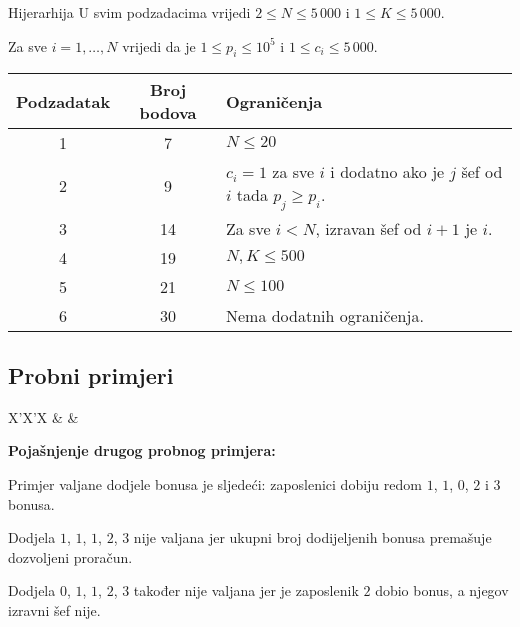 \begin{statement}[
  problempoints=100,
  timelimit=1 sekunda,
  memorylimit=1024 MiB,
]{Hijerarhija}
U svim podzadacima vrijedi $2 \leq N \leq 5\,000$ i $1 \leq K \leq 5\,000$.

Za sve $i = 1, \dots, N$ vrijedi da je $1 \leq p_i \leq 10^5$ i $1 \leq c_i \leq 5\,000$.

{\renewcommand{\arraystretch}{1.4}
  \setlength{\tabcolsep}{6pt}
  \begin{tabular}{ccl}
   Podzadatak & Broj bodova & Ograničenja \\ \midrule
   	1 & 7 & $N \leq 20$ \\
    2 & 9 & $c_i = 1$ za sve $i$ i dodatno ako je $j$ šef od $i$ tada $p_j \geq p_i$. \\
    3 & 14 & Za sve $i < N$, izravan šef od $i + 1$ je $i$. \\
    4 & 19 & $N, K \leq 500$ \\
    5 & 21 & $N \leq 100$ \\
    6 & 30 & Nema dodatnih ograničenja. \\
\end{tabular}}

\subsection*{Probni primjeri}
\begin{tabularx}{\textwidth}{X'X'X}
 &
 &
\end{tabularx}

\textbf{Pojašnjenje drugog probnog primjera:}

Primjer valjane dodjele bonusa je sljedeći: zaposlenici dobiju redom $1$, $1$, $0$, $2$ i $3$ bonusa.

Dodjela $1$, $1$, $1$, $2$, $3$ nije valjana jer ukupni broj dodijeljenih bonusa premašuje dozvoljeni proračun.

Dodjela $0$, $1$, $1$, $2$, $3$ također nije valjana jer je zaposlenik $2$ dobio bonus, a njegov izravni šef nije.

\end{statement}

